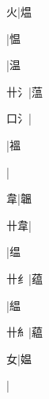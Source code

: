 \begin{multicols}{2}
{{\cjk{}{\cnsym{}　}{\cnsym{}　}火}|{\cjk{}煴}\par
{}|{\cjk{}愠}\par
{}|{\cjk{}温}\par
{\cjk{}{\cnsym{}　}卄{\cnxHanaA{}氵}}|{\cjk{}蕰}\par
{\cjk{}{\cnsym{}　}口{\cnxHanaA{}氵}}|{}\par
{}|{\cjk{}褞}\par
{}|{}\par
{\cjk{}{\cnsym{}　}{\cnsym{}　}韋}|{\cjk{}韞}\par
{\cjk{}{\cnsym{}　}卄韋}|{}\par
{}|{\cjk{}缊}\par
{\cjk{}{\cnsym{}　}卄{纟}}|{\cjk{}蕴}\par
{}|{\cjk{}緼}\par
{\cjk{}{\cnsym{}　}卄{糹}}|{\cjk{}藴}\par
{\cjk{}{\cnsym{}　}{\cnsym{}　}女}|{\cjk{}媪}\par
{\cjk{}{\cnsym{}　}{\cnsym{}　}{\cnsym{}　}}|{}\par
}
\end{multicols}
